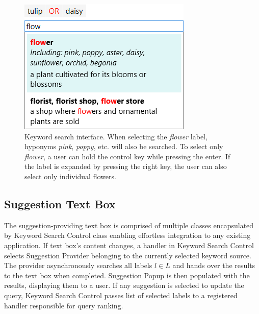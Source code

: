 \begin{figure}[ht]
	\centering
	\includegraphics[scale=0.5]{img/keyword-textbox.png}
	
	\caption[Keyword search interface]{Keyword search interface. When selecting the \textit{flower} label, hyponyms \textit{pink}, \textit{poppy}, etc. will also be searched. To select only \textit{flower}, a user can hold the control key while pressing the enter. If the label is expanded by pressing the right key, the user can also select only individual flowers.}
	\label{fig:keyword-textbox}
\end{figure}

\subsection{Suggestion Text Box}
The suggestion-providing text box is comprised of multiple classes encapsulated by Keyword Search Control class enabling effortless integration to any existing application. If text box's content changes, a handler in Keyword Search Control selects Suggestion Provider belonging to the currently selected keyword source. The provider asynchronously searches all labels $l\in L$ and hands over the results to the text box when completed. Suggestion Popup is then populated with the results, displaying them to a user. If any suggestion is selected to update the query, Keyword Search Control passes list of selected labels to a registered handler responsible for query ranking.

